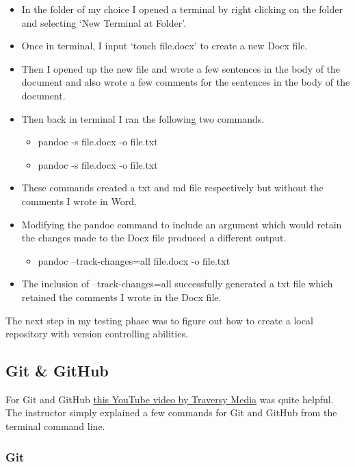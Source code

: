 \documentclass{article}
\begin{document}
 \begin{itemize}
        \item In the folder of my choice I opened a terminal by right clicking on the folder and selecting `New Terminal at Folder'.
        \item Once in terminal, I input `touch file.docx' to create a new Docx file.
        \item Then I opened up the new file and wrote a few sentences in the body of the document and also wrote a few comments for the sentences in the body of the document.
        \item Then back in terminal I ran the following two commands.
        \begin{itemize}
            \item pandoc -s file.docx -o file.txt
            \item pandoc -s file.docx -o file.txt
        \end{itemize}
        \item These commands created a txt and md file respectively but without the comments I wrote in Word.
        \item Modifying the pandoc command to include an argument which would retain the changes made to the Docx file produced a different output.
        \begin{itemize}
            \item pandoc --track-changes=all file.docx -o file.txt
        \end{itemize}
        \item The inclusion of --track-changes=all successfully generated a txt file which retained the comments I wrote in the Docx file.
\end{itemize}

The next step in my testing phase was to figure out how to create a local repository with version controlling abilities.

\subsection{Git \& GitHub}

For Git and GitHub \href{https://www.youtube.com/watch?v=SWYqp7iY_Tc}{this YouTube video by Traversy Media} was quite helpful. The instructor simply explained a few commands for Git and GitHub from the terminal command line.

\subsubsection{Git}
\end{document}
